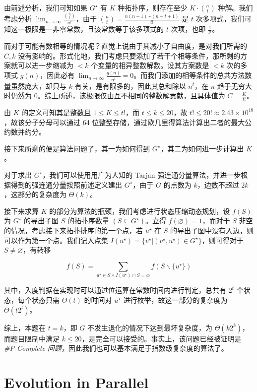 \documentclass[12pt]{ctexart}
\begin{document}
由前述分析，我们可知如果 $G^\star$ 有 $K$ 种拓扑序，则存在至少 $K \cdot \binom n t$ 种解。我们考虑分析 $\lim_{n\rightarrow \infty} \frac{\binom n t}{n^t}$，由于 $\binom nt = \frac{n(n-1)\cdots(n-t+1)}{t!}$ 是 $t$ 次多项式，我们可知这一极限是一非零常数，且该常数等于该多项式的 $t$ 次项，也即 $\frac 1{t!}$。

而对于可能有数相等的情况呢？直觉上说由于其减小了自由度，是对我们所需的 $C,k$ 没有影响的。形式化地，我们考虑只要添加了若干个相等条件，那所剩的方案就可以进一步缩减为 $<k$ 个变量的相异整数解数。设其方案数是 $<k$ 次的多项式 $g(n)$，因此必有 $\lim_{n\rightarrow \infty} \frac {g(n)}{n^t}=0$。而我们添加的相等条件的总共方法数量虽然庞大，却只与 $k$ 有关，是有限多的，因此其总和除以 $n^t$，在 $n$ 趋于无穷大时仍然为 $0$。综上所述，该极限仅由互不相同的整数解贡献，且具体值为 $C=\frac K{t!}$。

由 $K$ 的定义可知其是整数且 $1\le K\le t!$，而 $t\le k\le 20$，故 $t! \leq 20! \approx 2.43\times 10^{18}$，故该分子分母可以通过 64 位整型存储，通过欧几里得算法计算出二者的最大公约数并约分。

接下来所剩的便是算法问题了，其一为如何得到 $G^\star$，其二为如何进一步计算出 $K$。

对于求出 $G^\star$，我们可以使用用广为人知的 Tarjan 强连通分量算法，并进一步根据得到的强连通分量按照前述定义建出 $G^\star$，由于 $G$ 的点数为 $k$，边数不超过 $2k$，这部分的复杂度为 $\Theta(k)$。

接下来求算 $K$ 的部分为算法的瓶颈，我们考虑进行状态压缩动态规划，设 $f(S)$ 为 $G^\star$ 的导出子图 $S$ 的拓扑序数量 $(S\subseteq G^\star)$。立得 $f(\varnothing)=1$，而对于 $S$ 非空的情况，考虑接下来拓扑排序的第一个点，若 $u^\star$ 在 $S$ 的导出子图中没有入边，则可以作为第一个点。我们记入点集 $I(u^\star)=\{v^\star \vert (v^\star,u^\star)\in G^\star\}$，则可得对于 $S\neq \varnothing$，有转移

$$
f(S) = \sum_{u^\star \in S\wedge I(u^\star) \cap S=\varnothing} f(S\backslash \{u^\star\})
$$

其中，入度判据在实现时可以通过位运算在常数时间内进行判定，总共有 $2^t$ 个状态，每个状态只需 $\Theta(t)$ 的时间对 $u^\star$ 进行枚举，故这一部分的复杂度为 $\Theta(t2^t)$。

综上，本题在 $t=k$，即 $G$ 不发生退化的情况下达到最坏复杂度，为 $\Theta(k2^k)$，而题目限制中满足 $k\le 20$，是完全可以接受的。事实上，该问题已经被证明是 \emph{\#P-Complete 问题}\cite{sharppc}，因此我们也可以基本满足于指数级复杂度的算法了。

\newpage

\section{Evolution in Parallel}
\end{document}
